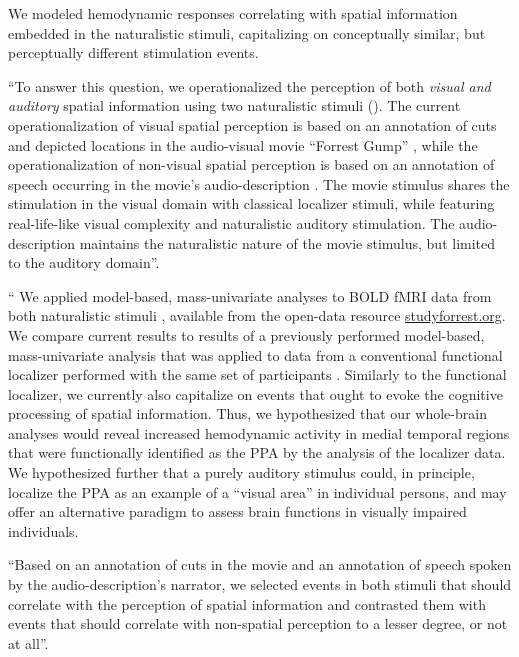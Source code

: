 We modeled hemodynamic responses correlating with spatial information embedded
in the naturalistic stimuli, capitalizing on conceptually similar, but
perceptually different stimulation events.


``To answer this question, we operationalized the perception of both
\textit{visual and auditory} spatial information using two naturalistic stimuli
(\citep[see reviews][]{hamilton2018revolution, hasson2008neurocinematics,
sonkusare2019naturalistic}).
The current operationalization of visual spatial perception is based on an
annotation of cuts and depicted locations in the audio-visual movie ``Forrest
Gump'' \citep{haeusler2016cutanno}, while
the operationalization of non-visual spatial perception is based on an
annotation of speech occurring in the movie's audio-description
\citep{haeusler2021studyforrest}.
The movie stimulus shares the stimulation in the visual domain with classical
localizer stimuli, while featuring real-life-like visual complexity and
naturalistic auditory stimulation. The audio-description maintains the
naturalistic nature of the movie stimulus, but limited to the auditory domain''.

``%
We applied model-based, mass-univariate analyses to BOLD fMRI data from both
naturalistic stimuli \citep{hanke2016simultaneous, hanke2014audiomovie},
available from the open-data resource
\href{http://www.studyforrest.org}{studyforrest.org}.
We compare current results to results of a previously performed model-based,
mass-univariate analysis that was applied to data from a conventional functional
localizer performed with the same set of participants
\citep{sengupta2016extension}.
Similarly to the functional localizer, we currently also capitalize on events
that ought to evoke the cognitive processing of spatial information.
Thus, we hypothesized that our whole-brain analyses would reveal increased
hemodynamic activity in medial temporal regions that were functionally
identified as the PPA by the analysis of the localizer data.
We hypothesized further that a purely auditory stimulus could, in principle,
localize the PPA as an example of a ``visual area'' in individual persons,
and may offer an alternative paradigm to assess brain functions in visually
impaired individuals.

%
``Based on an annotation of cuts in the movie and an annotation of speech spoken
by the audio-description's narrator, we selected events in both stimuli that
should correlate with the perception of spatial information and contrasted them
with events that should correlate with non-spatial perception to a lesser
degree, or not at all''.


